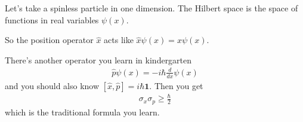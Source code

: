 Let's take a spinless particle in one dimension.
The Hilbert space is the space of functions in real variables
$\psi(x)$.

So the position operator $\hat{x}$ acts like
$\hat{x}\psi(x) = x \psi(x)$.

There's another operator you learn in kindergarten
\begin{align}
    \hat{p} \psi(x)
    = -i\hbar \frac{d}{dx}\psi(x)
\end{align}
and you should also know $[\hat{x},\hat{p}] = i\hbar\mathbf{1}$.
Then you get
\begin{align}
    \sigma_x \sigma_p \ge \frac{\hbar}{2}
\end{align}
which is the traditional formula you learn.
